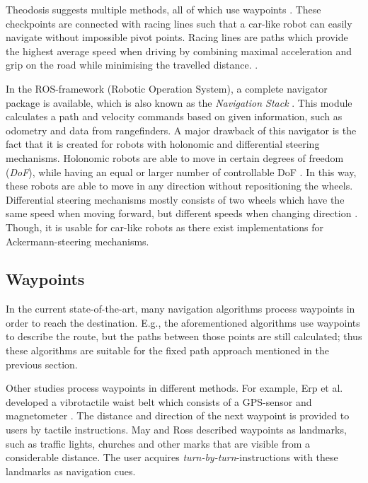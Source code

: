 \documentclass[conference,a4paper]{IEEEtran}
\begin{document}
Theodosis suggests multiple methods, all of which use waypoints \cite{Theodosis2014}. These checkpoints are connected with racing lines such that a car-like robot can easily navigate without impossible pivot points. Racing lines are paths which provide the highest average speed when driving by combining maximal acceleration and grip on the road while minimising the travelled distance. \cite{Macfarland2015}.

In the ROS-framework (Robotic Operation System), a complete navigator package is available, which is also known as the \emph{Navigation Stack} \cite{Marder-Eppstein2016}\cite{Marder-Eppstein2017}. This module calculates a path and velocity commands based on given information, such as odometry and data from rangefinders. A major drawback of this navigator is the fact that it is created for robots with holonomic and differential steering mechanisms. Holonomic robots are able to move in certain degrees of freedom (\emph{DoF}), while having an equal or larger number of controllable DoF \cite{Mariappan2009}. In this way, these robots are able to move in any direction without repositioning the wheels. Differential steering mechanisms mostly consists of two wheels which have the same speed when moving forward, but different speeds when changing direction \cite{Saidonr2011}. 
Though, it is usable for car-like robots as there exist implementations for Ackermann-steering mechanisms.

\subsection{Waypoints}
In the current state-of-the-art, many navigation algorithms process waypoints in order to reach the destination. E.g., the aforementioned algorithms \cite{Henson2008}\cite{Theodosis2014} use waypoints to describe the route, but the paths between those points are still calculated; thus these algorithms are suitable for the fixed path approach mentioned in the previous section.

Other studies process waypoints in different methods. For example, Erp et al. developed a vibrotactile waist belt which consists of a GPS-sensor and magnetometer \cite{Erp2005}. The distance and direction of the next waypoint is provided to users by tactile instructions. May and Ross \cite{May2006} described waypoints as landmarks, such as traffic lights, churches and other marks that are visible from a considerable distance. The user acquires \emph{turn-by-turn}-instructions with these landmarks as navigation cues.
\end{document}
